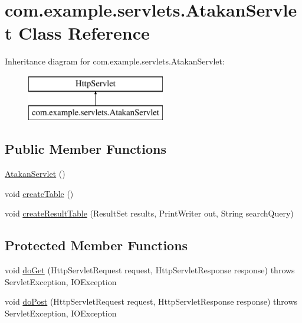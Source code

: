\hypertarget{classcom_1_1example_1_1servlets_1_1_atakan_servlet}{}\section{com.\+example.\+servlets.\+Atakan\+Servlet Class Reference}
\label{classcom_1_1example_1_1servlets_1_1_atakan_servlet}
Inheritance diagram for com.\+example.\+servlets.\+Atakan\+Servlet\+:\begin{figure}[H]
\begin{center}
\leavevmode
\includegraphics[height=2.000000cm]{classcom_1_1example_1_1servlets_1_1_atakan_servlet}
\end{center}
\end{figure}
\subsection*{Public Member Functions}
\begin{DoxyCompactItemize}
\item 
\hyperlink{classcom_1_1example_1_1servlets_1_1_atakan_servlet_a87e2532962ccd888df5a6e642ab6c047}{Atakan\+Servlet} ()
\item 
void \hyperlink{classcom_1_1example_1_1servlets_1_1_atakan_servlet_a58d74748199c3d7e4c4fc4a4dc4a4a9e}{create\+Table} ()
\item 
void \hyperlink{classcom_1_1example_1_1servlets_1_1_atakan_servlet_ac2023bcad8a5a066a74333ea8be8f9db}{create\+Result\+Table} (Result\+Set results, Print\+Writer out, String search\+Query)
\end{DoxyCompactItemize}
\subsection*{Protected Member Functions}
\begin{DoxyCompactItemize}
\item 
void \hyperlink{classcom_1_1example_1_1servlets_1_1_atakan_servlet_a958df833cc34bf6033b56121d82459d1}{do\+Get} (Http\+Servlet\+Request request, Http\+Servlet\+Response response)  throws Servlet\+Exception, I\+O\+Exception 
\item 
void \hyperlink{classcom_1_1example_1_1servlets_1_1_atakan_servlet_ac40ca8b0badf1b9e4ef13f6ba72bf3b6}{do\+Post} (Http\+Servlet\+Request request, Http\+Servlet\+Response response)  throws Servlet\+Exception, I\+O\+Exception 
\end{DoxyCompactItemize}
